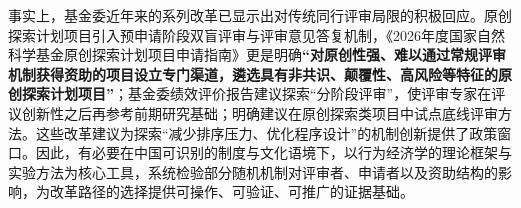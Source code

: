 
事实上，基金委近年来的系列改革已显示出对传统同行评审局限的积极回应。原创探索计划项目引入预申请阶段双盲评审与评审意见答复机制，《2026年度国家自然科学基金原创探索计划项目申请指南》更是明确\textbf{“对原创性强、难以通过常规评审机制获得资助的项目设立专门渠道，遴选具有非共识、颠覆性、高风险等特征的原创探索计划项目”}；基金委绩效评价报告建议探索“分阶段评审”，使评审专家在评议创新性之后再参考前期研究基础；\cite{BaochenzhouHRC2023}明确建议在原创探索类项目中试点底线评审方法。这些改革建议为探索“减少排序压力、优化程序设计”的机制创新提供了政策窗口。因此，有必要在中国可识别的制度与文化语境下，以行为经济学的理论框架与实验方法为核心工具，系统检验部分随机机制对评审者、申请者以及资助结构的影响，为改革路径的选择提供可操作、可验证、可推广的证据基础。




